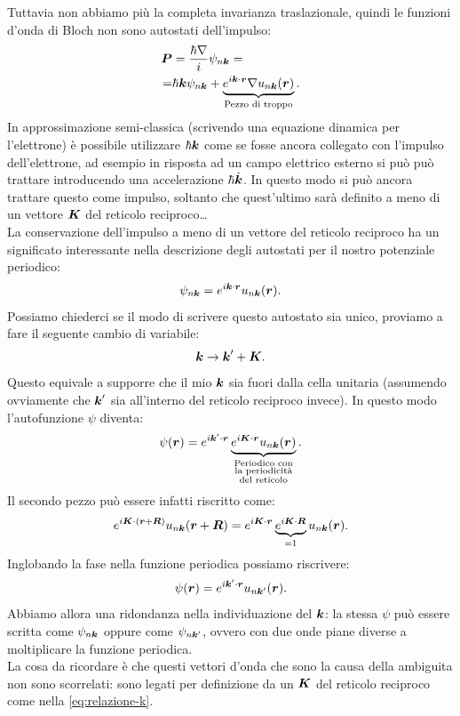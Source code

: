 Tuttavia non abbiamo più la completa invarianza traslazionale, quindi le funzioni d'onda di Bloch non sono autostati dell'impulso:
\[\begin{aligned}
	\boldsymbol{P} 
	&=
	\frac{\hbar \nabla}{i}\psi_{n\boldsymbol{k}}=\\
	=&
	\hbar \boldsymbol{k}\psi_{n\boldsymbol{k}}+
	\underbrace{e^{i\boldsymbol{k}\cdot\boldsymbol{r}}\nabla u_{n\boldsymbol{k}}(\boldsymbol{r})}_
	{\text{Pezzo di troppo}}
.\end{aligned}\]
In approssimazione semi-classica (scrivendo una equazione dinamica per l'elettrone) è possibile utilizzare $\hbar \boldsymbol{k}$ come se fosse ancora collegato con l'impulso dell'elettrone, ad esempio in risposta ad un campo elettrico esterno si può può trattare introducendo una accelerazione $\hbar \dot{\boldsymbol{k}}$. In questo modo si può ancora trattare questo come impulso, soltanto che quest'ultimo sarà definito a meno di un vettore $\boldsymbol{K}$ del reticolo reciproco\ldots\\
La conservazione dell'impulso a meno di un vettore del reticolo reciproco ha un significato interessante nella descrizione degli autostati per il nostro potenziale periodico:
\[
	\psi_{n\boldsymbol{k}}=e^{i\boldsymbol{k}\cdot\boldsymbol{r}}u_{n\boldsymbol{k}}(\boldsymbol{r})
.\] 
Possiamo chiederci se il modo di scrivere questo autostato sia unico, proviamo a fare il seguente cambio di variabile:
\[
	\boldsymbol{k}\to \boldsymbol{k}'+\boldsymbol{K} \label{eq:relazione-k}
.\] 
Questo equivale a supporre che il mio $\boldsymbol{k}$ sia fuori dalla cella unitaria (assumendo ovviamente che $\boldsymbol{k}'$ sia all'interno del reticolo reciproco invece). In questo modo l'autofunzione $\psi$ diventa:
\[
	\psi(\boldsymbol{r})= e^{i\boldsymbol{k}'\cdot\boldsymbol{r}}
	\underbrace{e^{i\boldsymbol{K}\cdot\boldsymbol{r}}u_{n\boldsymbol{k}}(\boldsymbol{r})}_
	{\substack{\text{Periodico con}\\ \text{la periodicità}\\ \text{del reticolo}}}
.\] 
Il secondo pezzo può essere infatti riscritto come:
\[
	e^{i\boldsymbol{K}\cdot\left( \boldsymbol{r}+\boldsymbol{R} \right) }u_{n\boldsymbol{k}}(\boldsymbol{r}+\boldsymbol{R}) =
	e^{i\boldsymbol{K}\cdot\boldsymbol{r}}\underbrace{e^{i\boldsymbol{K}\cdot\boldsymbol{R}}}_{=1}
	u_{n\boldsymbol{k}}(\boldsymbol{r})
.\] 
Inglobando la fase nella funzione periodica possiamo riscrivere:
\[
	\psi(\boldsymbol{r})= e^{i\boldsymbol{k}'\cdot\boldsymbol{r}}u_{n\boldsymbol{k}'}(\boldsymbol{r})
.\] 
Abbiamo allora una ridondanza nella individuazione del $\boldsymbol{k}$: la stessa $\psi$ può essere scritta come $\psi_{n\boldsymbol{k}}$ oppure come $\psi_{n\boldsymbol{k}'}$, ovvero con due onde piane diverse a moltiplicare la funzione periodica. \\
La cosa da ricordare è che questi vettori d'onda che sono la causa della ambiguita non sono scorrelati: sono legati per definizione da un $\boldsymbol{K}$ del reticolo reciproco come nella \ref{eq:relazione-k}.\\
